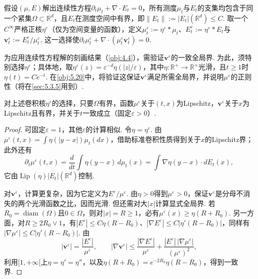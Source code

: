 假设$(\mu,E)$解出连续性方程$\partial_t\mu_t+\nabla\cdot E_t=0$，所有测度$\mu_t$与$E_t$的支集均包含于同一个紧集$\Omega\subset\mathbb R^d$，且$E_t$在测度空间中有界，即$\|E_t\|:=|E_t|(\mathbb R^d)\le C$. 取一个$C^\infty$严格正核$\eta^\varepsilon$（仅为空间变量的函数），定义$\mu_t^\varepsilon:=\eta^\varepsilon*\mu_t$、$E_t^\varepsilon:=\eta^\varepsilon*E_t$与$\mathbf v_t^\varepsilon:=E_t^\varepsilon/\mu_t^\varepsilon$. 这一选择使$\partial_t\mu_t^\varepsilon+\nabla\cdot(\mu_t^\varepsilon\mathbf v_t^\varepsilon)=0$.

为应用连续性方程解的刻画结果（\autoref{obj:4.4}），需验证$\mathbf v^\varepsilon$的一致全局界. 为此，须特别选择$\eta^\varepsilon$；具体地，取$\eta^\varepsilon(z)=\varepsilon^{-d}\eta(|z|/\varepsilon)$，其中$\eta:\mathbb R^+\to\mathbb R^+$光滑，且$t\ge1$时$\eta(t)=Ce^{-t}$. 在\autoref{obj:5.20}中，将验证这保证$\mathbf v^\varepsilon$满足所需全局界，并说明$\mu^\varepsilon$的正则性（将在\autoref{sec:5.3.5}用到）.

\begin{lemma}\label{obj:5.20}
对上述卷积核$\eta^\varepsilon$的选择，只要$\Omega$有界，函数$\mu^\varepsilon$关于$(t,x)$为Lipschitz，$\mathbf v^\varepsilon$关于$x$为Lipschitz且有界，并关于$t$一致成立（固定$\varepsilon>0$）.
\end{lemma}
\begin{proof}
可固定$\varepsilon=1$，其他$\varepsilon$的计算相似. 令$\eta=\eta^\varepsilon$. 由$\mu^\varepsilon(t,x)=\int\eta(|y-x|)\mu_t(dx)$，借助标准卷积性质得到关于$x$的Lipschitz界；此外还有
\[
\partial_t\mu^\varepsilon(t,x)
=\frac d{dt}\int\eta(y-x)\,d\mu_t(x)
=\int\nabla\eta(y-x)\cdot dE_t(x),
\]
它由$\operatorname{Lip}(\eta)|E_t|(\mathbb R^d)$控制.

对$\mathbf v^\varepsilon$，计算更复杂，因为它定义为$E^\varepsilon/\mu^\varepsilon$. 由$\eta>0$得到$\mu^\varepsilon>0$，保证$\mathbf v^\varepsilon$是分母不消失的两个光滑函数之比，因而光滑. 但还需对大$|x|$计算显式全局界. 若$R_0=\operatorname{diam}(\Omega)$且$0\in\Omega$，则对$|x|=R\ge1$，必有$\mu^\varepsilon(x)\ge\eta(R+R_0)$. 另一方面，对$R\ge2R_0\vee1$，有$|E^\varepsilon|\le C\eta(R-R_0)$、$|\nabla E^\varepsilon|\le C|\eta'(R-R_0)|$，同样有$|\nabla\mu^\varepsilon|\le C|\eta'(R-R_0)|$. 由
\[
|\mathbf v^\varepsilon|=\frac{|E^\varepsilon|}{\mu^\varepsilon},
\qquad|\nabla\mathbf v^\varepsilon|
\le\frac{|\nabla E^\varepsilon|}{\mu^\varepsilon}
+\frac{|E^\varepsilon|\,|\nabla\mu^\varepsilon|}{(\mu^\varepsilon)^2},
\]
利用$[1,+\infty[$上$\eta=\eta'=\eta''$，以及$\eta(R+R_0)=e^{-2R_0}\eta(R-R_0)$，得到一致界.
\end{proof}

